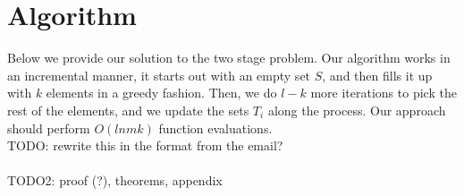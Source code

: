 \section{Algorithm}
\label{sec::algorithm}

Below we provide our solution to the two stage problem. Our algorithm works in an incremental manner, it starts out with an empty set $S$, and then fills it up with $k$ elements in a greedy fashion. Then, we do $l-k$ more iterations to pick the rest of the elements, and we update the sets $T_i$ along the process. Our approach should perform $O(l n m k)$ function evaluations.
\\
 






TODO: rewrite this in the format from the email? \\
\\
TODO2: proof (?), theorems, appendix
